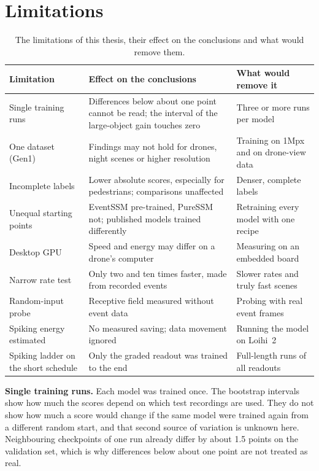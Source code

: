 \documentclass[11pt, a4paper]{report}
\begin{document}
\section{Limitations}
\label{sec:limitations}
\begin{table}[htbp]
\centering
\small
\caption[Limitations and their effect]{The limitations of this thesis, their effect on the conclusions and what would
    remove them.}
\label{tab:limitations}
\begin{tabularx}{\textwidth}{@{}>{\raggedright\arraybackslash}p{3.1cm}>{\raggedright\arraybackslash}X>{\raggedright\arraybackslash}X@{}}
\toprule
\textbf{Limitation} & \textbf{Effect on the conclusions} & \textbf{What would remove it} \\
\midrule
Single training runs & Differences below about one point cannot be read; the interval of the large-object gain touches zero
  & Three or more runs per model \\
One dataset (Gen1) & Findings may not hold for drones, night scenes or higher resolution
  & Training on 1Mpx and on drone-view data \\
Incomplete labels & Lower absolute scores, especially for pedestrians; comparisons unaffected
  & Denser, complete labels \\
Unequal starting points & EventSSM pre-trained, PureSSM not; published models trained differently
  & Retraining every model with one recipe \\
Desktop GPU & Speed and energy may differ on a drone's computer & Measuring on an embedded board \\
Narrow rate test & Only two and ten times faster, made from recorded events
  & Slower rates and truly fast scenes \\
Random-input probe & Receptive field measured without event data & Probing with real event frames \\
Spiking energy estimated & No measured saving; data movement ignored & Running the model on Loihi~2 \\
Spiking ladder on the short schedule & Only the graded readout was trained to the end
  & Full-length runs of all readouts \\
\bottomrule
\end{tabularx}
\end{table}

\textbf{Single training runs.} Each model was trained once. The bootstrap intervals show how much the scores
depend on which test recordings are used. They do not show how much a score would change if the same model
were trained again from a different random start, and that second source of variation is unknown here.
Neighbouring checkpoints of one run already differ by about 1.5 points on the validation set, which is why
differences below about one point are not treated as real.
\end{document}
